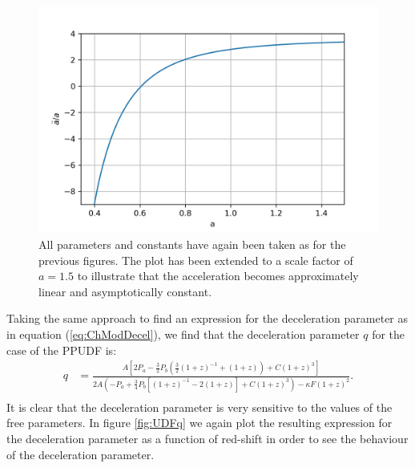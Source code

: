 \documentclass[a4paper, 11pt]{FSKH_623_Report}
\numberwithin{equation}{section}
\newcommand{\brac}[1]{\left(#1\right)}
\newcommand{\bracc}[1]{\left[#1\right]}
\begin{document}
\begin{figure}[H]
\centering
\includegraphics[scale=1]{Figures/UDF_addot.jpg}
\caption{All parameters and constants have again been taken as for the previous figures. The plot has been extended to a scale factor of $a=1.5$ to illustrate that the acceleration becomes approximately linear and asymptotically constant.  }
\label{fig:UDFRay}
\end{figure} 
Taking the same approach to find an expression for the deceleration parameter as in equation (\ref{eq:ChModDecel}), we find that the deceleration parameter $q$ for the case of the PPUDF is:
\begin{equation}\label{eq:UDFq}
\begin{split}
q &= \frac{A\bracc{2P_{a}-\frac{3}{2}P_{b}\brac{\frac{3}{2}\brac{1+z}^{-1}+\brac{1+z}}+C\brac{1+z}^{3}}}{2A\brac{-P_{a}+\frac{3}{4}P_{b}\bracc{\brac{1+z}^{-1}-2\brac{1+z}}+C\brac{1+z}^{3}} -\kappa F \brac{1+z}^{2}}.        \\
\end{split}
\end{equation}
It is clear that the deceleration parameter is very sensitive to the values of the free parameters. In figure \ref{fig:UDFq} we again plot the resulting expression for the deceleration parameter as a function of red-shift in order to see the behaviour of the deceleration parameter.
\end{document}
